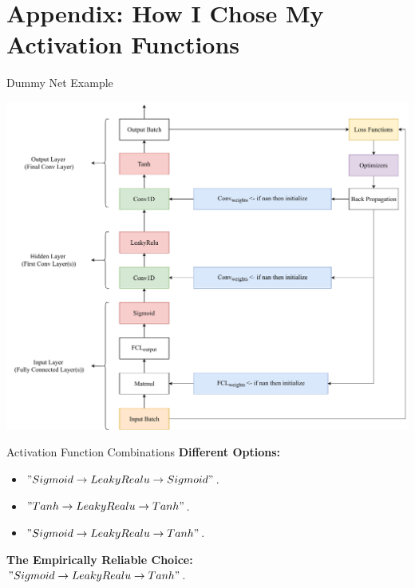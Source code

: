 \documentclass{beamer}
\begin{document}
	\section{Appendix: How I Chose My Activation Functions}
	\begin{frame}{Dummy Net Example}
		\begin{center}
			\includegraphics[height=0.9\textheight]{SimpleNetDiagram}
		\end{center}
	\end{frame}
		\begin{frame}{Activation Function Combinations}
			\textbf{Different Options:}
			\begin{itemize}
				\item $" Sigmoid \rightarrow LeakyRealu \rightarrow Sigmoid "$.
				\item $" Tanh \rightarrow LeakyRealu \rightarrow Tanh "$.
				\item $" Sigmoid \rightarrow LeakyRealu \rightarrow Tanh "$.
			\end{itemize}
			\textbf{The Empirically Reliable Choice:}\\
			\centering $" Sigmoid \rightarrow LeakyRealu \rightarrow Tanh "$.
		\end{frame}
\end{document}
